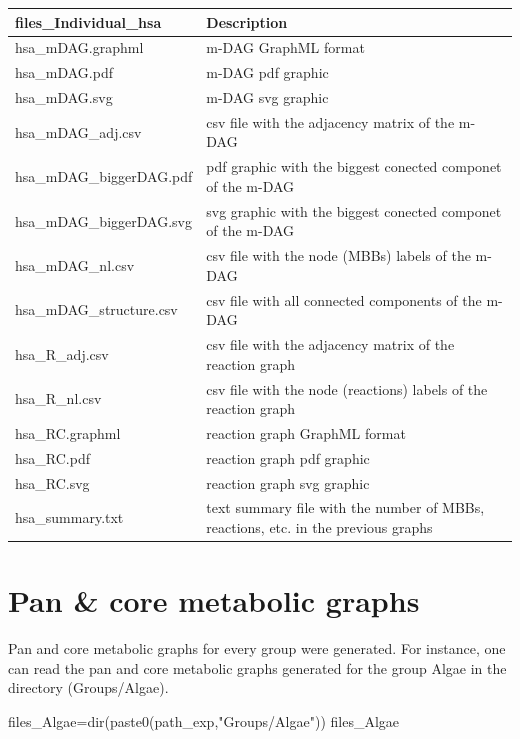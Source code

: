 \documentclass[
  letterpaper,
  DIV=11,
  numbers=noendperiod]{scrreprt}
\newenvironment{Shaded}{}{}
\newcommand{\FunctionTok}[1]{\textcolor[rgb]{0.38,0.69,0.94}{#1}}
\newcommand{\NormalTok}[1]{\textcolor[rgb]{0.67,0.70,0.75}{#1}}
\newcommand{\OtherTok}[1]{\textcolor[rgb]{0.15,0.68,0.38}{#1}}
\newcommand{\StringTok}[1]{\textcolor[rgb]{0.60,0.76,0.47}{#1}}
\begin{document}
\begin{tabular}{l|l}
\hline
files\_Individual\_hsa & Description\\
\hline
hsa\_mDAG.graphml & m-DAG GraphML format\\
\hline
hsa\_mDAG.pdf & m-DAG pdf graphic\\
\hline
hsa\_mDAG.svg & m-DAG svg graphic\\
\hline
hsa\_mDAG\_adj.csv & csv file with the adjacency matrix of the m-DAG\\
\hline
hsa\_mDAG\_biggerDAG.pdf & pdf graphic with the biggest conected componet of the m-DAG\\
\hline
hsa\_mDAG\_biggerDAG.svg & svg graphic with the biggest conected componet of the m-DAG\\
\hline
hsa\_mDAG\_nl.csv & csv file with the node (MBBs) labels  of the m-DAG\\
\hline
hsa\_mDAG\_structure.csv & csv file with all connected components of the m-DAG\\
\hline
hsa\_R\_adj.csv & csv file with the  adjacency matrix of the reaction graph\\
\hline
hsa\_R\_nl.csv & csv file with the node (reactions) labels  of the reaction graph\\
\hline
hsa\_RC.graphml & reaction graph  GraphML format\\
\hline
hsa\_RC.pdf & reaction graph pdf graphic\\
\hline
hsa\_RC.svg & reaction graph svg graphic\\
\hline
hsa\_summary.txt & text summary file with the number of MBBs, reactions, etc. in the previous graphs\\
\hline
\end{tabular}

\hypertarget{pan-core-metabolic-graphs}{%
\section{Pan \& core metabolic graphs}\label{pan-core-metabolic-graphs}}

Pan and core metabolic graphs for every group were generated. For
instance, one can read the pan and core metabolic graphs generated for
the group Algae in the directory (Groups/Algae).

\begin{Shaded}
\begin{Highlighting}[]
\NormalTok{files\_Algae}\OtherTok{=}\FunctionTok{dir}\NormalTok{(}\FunctionTok{paste0}\NormalTok{(path\_exp,}\StringTok{"Groups/Algae"}\NormalTok{))}
\NormalTok{files\_Algae}
\end{Highlighting}
\end{Shaded}
\end{document}
